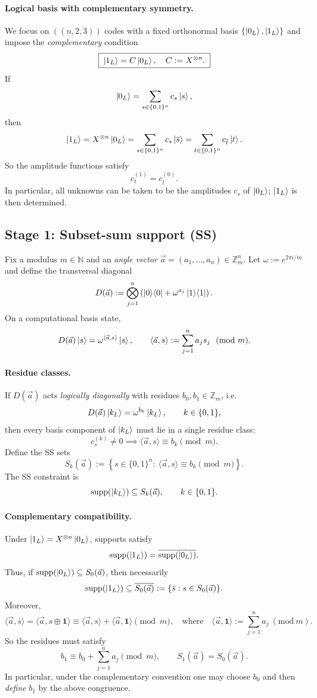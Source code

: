 \documentclass[11pt]{article}
\begin{document}
\paragraph{Logical basis with complementary symmetry.}
We focus on \(((n,2,3))\) codes with a fixed orthonormal basis \(\{\ket{0_L},\ket{1_L}\}\)
and impose the \emph{complementary} condition
\[
\boxed{\;\ket{1_L}=C\ket{0_L},\quad C:=X^{\otimes n}.\;}
\]
If
\[
\ket{0_L}=\sum_{s\in\{0,1\}^n}c_s\ket{s},
\]
then
\[
\ket{1_L}=X^{\otimes n}\ket{0_L}=\sum_{s\in\{0,1\}^n}c_s\ket{\overline{s}}
=\sum_{t\in\{0,1\}^n}c_{\overline{t}}\ket{t}.
\]
So the amplitude functions satisfy
\[
\boxed{\;c^{(1)}_t = c^{(0)}_{\overline{t}}.\;}
\]
In particular, all unknowns can be taken to be the amplitudes \(c_s\) of \(\ket{0_L}\); \(\ket{1_L}\) is then determined.

\subsection{Stage 1: Subset-sum support (SS)}

Fix a modulus \(m\in\mathbb{N}\) and an \emph{angle vector}
\(\vec a=(a_1,\dots,a_n)\in\mathbb{Z}_m^n\).
Let \(\omega:=e^{2\pi i/m}\) and define the transversal diagonal
\[
D(\vec a):=\bigotimes_{j=1}^n\left(\ket{0}\!\bra{0}+\omega^{a_j}\ket{1}\!\bra{1}\right).
\]
On a computational basis state,
\[
D(\vec a)\ket{s}=\omega^{\langle \vec a,s\rangle}\ket{s},
\qquad
\langle \vec a,s\rangle := \sum_{j=1}^n a_js_j\ \ (\mathrm{mod}\ m).
\]

\paragraph{Residue classes.}
If \(D(\vec a)\) acts \emph{logically diagonally} with residues \(b_0,b_1\in\mathbb{Z}_m\),
i.e.
\[
D(\vec a)\ket{k_L}=\omega^{b_k}\ket{k_L},\qquad k\in\{0,1\},
\]
then every basis component of \(\ket{k_L}\) must lie in a single residue class:
\[
c^{(k)}_s\neq 0\implies \langle \vec a,s\rangle\equiv b_k\pmod m.
\]
Define the SS sets
\[
S_k(\vec a):=\left\{s\in\{0,1\}^n:\ \langle \vec a,s\rangle\equiv b_k\pmod m\right\}.
\]
The SS constraint is
\[
\mathrm{supp}(\ket{k_L})\subseteq S_k(\vec a),\qquad k\in\{0,1\}.
\]

\paragraph{Complementary compatibility.}
Under \(\ket{1_L}=X^{\otimes n}\ket{0_L}\), supports satisfy
\[
\mathrm{supp}(\ket{1_L})=\overline{\mathrm{supp}(\ket{0_L})}.
\]
Thus, if \(\mathrm{supp}(\ket{0_L})\subseteq S_0(\vec a)\), then necessarily
\[
\mathrm{supp}(\ket{1_L})\subseteq \overline{S_0(\vec a)}:=\{\overline{s}:s\in S_0(\vec a)\}.
\]
Moreover,
\[
\langle \vec a,\overline{s}\rangle
=\langle \vec a,s\oplus\mathbf{1}\rangle
\equiv \langle \vec a,s\rangle + \langle \vec a,\mathbf{1}\rangle\pmod m,
\quad\text{where}\quad
\langle \vec a,\mathbf{1}\rangle:=\sum_{j=1}^n a_j\ (\mathrm{mod}\ m).
\]
So the residues must satisfy
\[
\boxed{\;b_1\equiv b_0+\sum_{j=1}^n a_j\pmod m,\qquad S_1(\vec a)=\overline{S_0(\vec a)}.\;}
\]
In particular, under the complementary convention one may choose \(b_0\) and then \emph{define} \(b_1\) by the above congruence.
\end{document}
